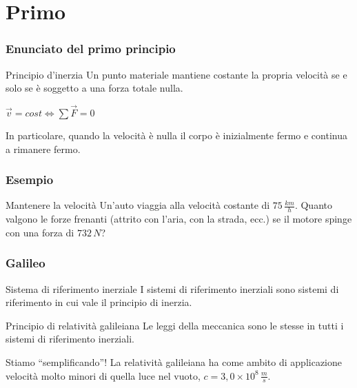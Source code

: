 \documentclass[]{beamer}
\theoremstyle{plain}
\begin{document}
\section{Primo}




\begin{frame}
  \frametitle{Enunciato del primo principio}
\begin{block}{Principio d'inerzia}
Un punto materiale mantiene costante la propria velocità se e solo se è soggetto a una forza totale nulla.
\begin{center}
\colorbox{marroncino!30}{$ \vec{v} = cost \Longleftrightarrow \sum \vec{F} = 0 $}\pause
\end{center}
In particolare, quando la velocità è nulla il corpo è inizialmente fermo e continua a rimanere fermo.
\end{block}
\end{frame}


\begin{frame}
\frametitle{Esempio}
\begin{exampleblock}{Mantenere la velocità}
{\small Un'auto viaggia alla velocità costante di $ 75 \, \frac{km}{h} $. Quanto valgono le forze frenanti (attrito con l'aria, con la strada, ecc.) se il motore spinge con una forza di $ 732 \, N $?}
\end{exampleblock}
\end{frame}




\begin{frame}
  \frametitle{Galileo}
\begin{block}{Sistema di riferimento inerziale}
I sistemi di riferimento inerziali sono sistemi di riferimento in cui vale il principio di inerzia.
\end{block}\pause
\begin{block}{Principio di relatività galileiana}
Le leggi della meccanica sono le stesse in tutti i sistemi di riferimento inerziali.
\end{block}\pause
\begin{alertblock}{Stiamo ``semplificando''!}
La relatività galileiana ha come ambito di applicazione velocità molto minori di quella luce nel vuoto, $ c = 3,0 \times 10^8 \, \frac{m}{s} $.
\end{alertblock}
\end{frame}
\end{document}
